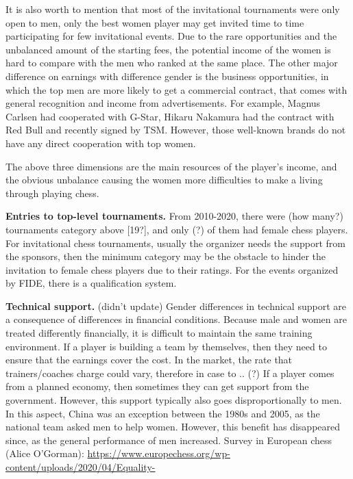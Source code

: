 It is also worth to mention that most of the invitational tournaments were only open to men, only the best women player may get invited time to time participating for few invitational events. Due to the rare opportunities and the unbalanced amount of the starting fees, the potential income of the women is hard to compare with the men who ranked at the same place.
The other major difference on earnings with difference gender is the business opportunities, in which the top men are more likely to get a commercial contract, that comes with general recognition and income from advertisements. For example, Magnus Carlsen had cooperated with G-Star, Hikaru Nakamura had the contract with Red Bull and recently signed by TSM. However, those well-known brands do not have any direct cooperation with top women.

The above three dimensions are the main resources of the player’s income, and the obvious unbalance causing the women more difficulties to make a living through playing chess.

{\bf Entries to top-level tournaments.}
From 2010-2020, there were (how many?) tournaments category above [19?], and only (?) of them had female chess players.
For invitational chess tournaments, usually the organizer needs the support from the sponsors, then the minimum category may be the obstacle to hinder the invitation to female chess players due to their ratings.
For the events organized by FIDE, there is a qualification system.

{\bf Technical support.} (didn’t update) Gender differences in technical support are a consequence of differences in financial conditions. Because male and women are treated differently financially, it is difficult to maintain the same training environment. If a player is building a team by themselves, then they need to ensure that the earnings cover the cost. In the market, the rate that trainers/coaches charge could vary, therefore in case to .. (?) If a player comes from a planned economy, then sometimes they can get support from the government. However, this support typically also goes disproportionally to men. In this aspect, China was an exception between the 1980s and 2005, as the national team asked men to help women. However, this benefit has disappeared since, as the general performance of men increased.
Survey in European chess (Alice O'Gorman): \url{https://www.europechess.org/wp-content/uploads/2020/04/Equality-}


